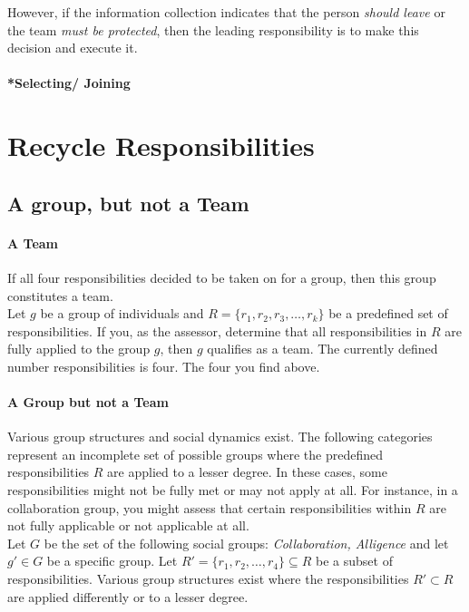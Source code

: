 However, if the information collection indicates that the person \textit{should leave} or the team \textit{must be protected}, then the leading responsibility is to make this decision and execute it.

\paragraph{*Selecting/ Joining}
\section{Recycle Responsibilities}
\subsection{A group, but not a Team}

\paragraph{A Team} If all four responsibilities decided to be taken on for a group, then this group constitutes a team.\\

Let $ g $ be a group of individuals and $ R = \{ r_1, r_2, r_3, \ldots, r_k \}$ be a predefined set of responsibilities. If you, as the assessor, determine that all responsibilities in $ R $ are fully applied to the group $ g $, then $ g $ qualifies as a team. The currently defined number responsibilities is four. The four you find above.

\paragraph{A Group but not a Team} Various group structures and social dynamics exist. The following categories represent an incomplete set of possible groups where the predefined responsibilities $ R $ are applied to a lesser degree. In these cases, some responsibilities might not be fully met or may not apply at all.  For instance, in a collaboration group, you might assess that certain responsibilities within $ R $ are not fully applicable or not applicable at all.\\

Let $ G $ be the set of the following social groups: \textit{Collaboration, Alligence} and let $ g' \in G $ be a specific group. Let $ R' = \{ r_1, r_2, \ldots, r_4 \} \subseteq R $ be a subset of responsibilities. Various group structures exist where the responsibilities $ R'\subset R $ are applied differently or to a lesser degree.\\

